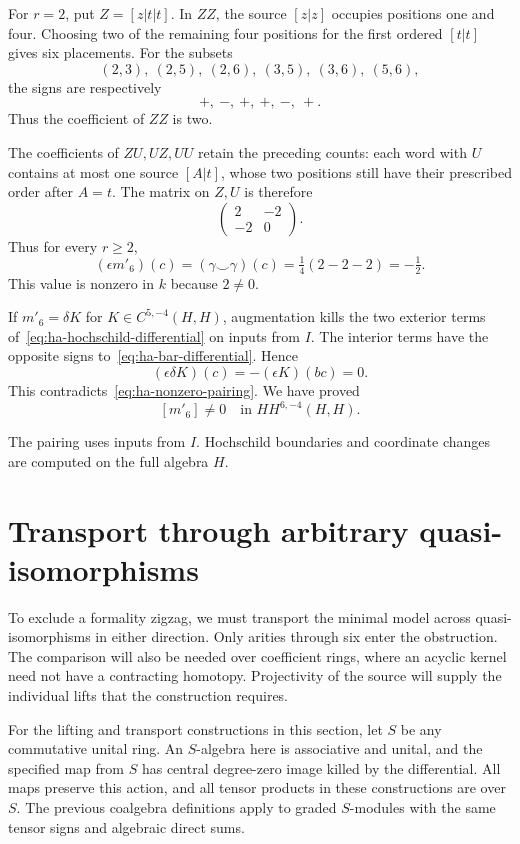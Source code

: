 For $r=2$, put $Z=[z|t|t]$.
In $ZZ$, the source $[z|z]$ occupies positions one and four.
Choosing two of the remaining four positions for the first ordered
$[t|t]$ gives six placements.
For the subsets
\[
 (2,3),\ (2,5),\ (2,6),\ (3,5),\ (3,6),\ (5,6),
\]
the signs are respectively
\[
 +,\ -,\ +,\ +,\ -,\ +.
\]
Thus the coefficient of $ZZ$ is two.

The coefficients of $ZU,UZ,UU$ retain the preceding counts:
each word with $U$ contains at most one source $[A|t]$, whose
two positions still have their prescribed order after $A=t$.
The matrix on $Z,U$ is therefore
\[
 \begin{pmatrix}2&-2\\-2&0\end{pmatrix}.
\]
Thus for every $r\geq2$,
\begin{equation}\label{eq:ha-nonzero-pairing}
 (\epsilon m'_6)(c)=(\gamma\smile\gamma)(c)
 =\tfrac14(2-2-2)=-\tfrac12.
\end{equation}
This value is nonzero in $k$ because $2\ne0$.

If $m'_6=\delta K$ for $K\in C^{5,-4}(H,H)$, augmentation kills
the two exterior terms of~\eqref{eq:ha-hochschild-differential}
on inputs from $I$. The interior terms have the opposite signs
to~\eqref{eq:ha-bar-differential}. Hence
\[
 (\epsilon\delta K)(c)=-(\epsilon K)(bc)=0.
\]
This contradicts~\eqref{eq:ha-nonzero-pairing}. We have proved
\begin{equation}\label{eq:ha-nonzero-class}
 [m'_6]\ne0\quad\text{in }HH^{6,-4}(H,H).
\end{equation}

The pairing uses inputs from $I$.
Hochschild boundaries and coordinate changes are computed on the
full algebra $H$.

\section{Transport through arbitrary quasi-isomorphisms}
\label{sec:ha-transport}

To exclude a formality zigzag, we must transport the minimal model
across quasi-isomorphisms in either direction.
Only arities through six enter the obstruction.
The comparison will also be needed over coefficient rings, where an
acyclic kernel need not have a contracting homotopy.
Projectivity of the source will supply the individual lifts that the
construction requires.

For the lifting and transport constructions in this section, let $S$
be any commutative unital ring.
An $S$-algebra here is associative and unital, and the specified map
from $S$ has central degree-zero image killed by the differential.
All maps preserve this action, and all tensor products in these
constructions are over $S$.
The previous coalgebra definitions apply to graded $S$-modules with
the same tensor signs and algebraic direct sums.

